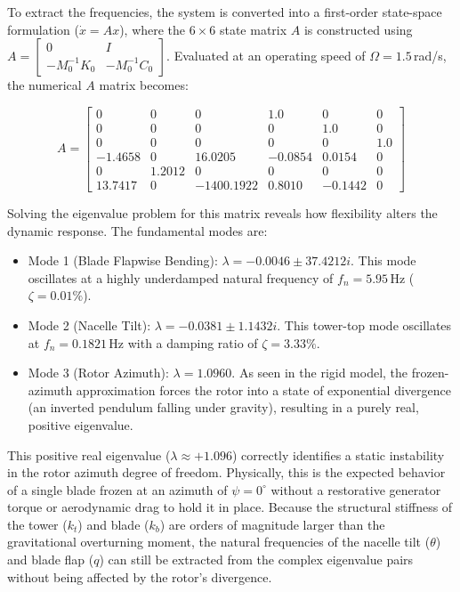 \documentclass[final,onecolumn]{IEEEtran}
\begin{document}
To extract the frequencies, the system is converted into a first-order state-space formulation ($\dot{x} = Ax$), where the $6 \times 6$ state matrix $A$ is constructed using $A = \left[ \begin{smallmatrix} 0 & I \\ -M_0^{-1}K_0 & -M_0^{-1}C_0 \end{smallmatrix} \right]$. Evaluated at an operating speed of $\Omega = 1.5$\,rad/s, the numerical $A$ matrix becomes:

\begin{equation}
    \label{eq:linear2_A_matrix}
    A = \begin{bmatrix}
        0       & 0      & 0          & 1.0     & 0       & 0   \\
        0       & 0      & 0          & 0       & 1.0     & 0   \\
        0       & 0      & 0          & 0       & 0       & 1.0 \\
        -1.4658 & 0      & 16.0205    & -0.0854 & 0.0154  & 0   \\
        0       & 1.2012 & 0          & 0       & 0       & 0   \\
        13.7417 & 0      & -1400.1922 & 0.8010  & -0.1442 & 0
    \end{bmatrix}
\end{equation}

Solving the eigenvalue problem for this matrix reveals how flexibility alters the dynamic response. The fundamental modes are:

\begin{itemize}
    \item Mode 1 (Blade Flapwise Bending): $\lambda = -0.0046 \pm 37.4212i$. This mode oscillates at a highly underdamped natural frequency of $f_n = 5.95$\,Hz ($\zeta = 0.01\%$).
    \item Mode 2 (Nacelle Tilt): $\lambda = -0.0381 \pm 1.1432i$. This tower-top mode oscillates at $f_n = 0.1821$\,Hz with a damping ratio of $\zeta = 3.33\%$.
    \item Mode 3 (Rotor Azimuth): $\lambda = 1.0960$. As seen in the rigid model, the frozen-azimuth approximation forces the rotor into a state of exponential divergence (an inverted pendulum falling under gravity), resulting in a purely real, positive eigenvalue.
\end{itemize}

This positive real eigenvalue ($\lambda \approx +1.096$) correctly identifies a static instability in the rotor azimuth degree of freedom. Physically, this is the expected behavior of a single blade frozen at an azimuth of $\psi=0^\circ$ without a restorative generator torque or aerodynamic drag to hold it in place. Because the structural stiffness of the tower ($k_t$) and blade ($k_b$) are orders of magnitude larger than the gravitational overturning moment, the natural frequencies of the nacelle tilt ($\theta$) and blade flap ($q$) can still be extracted from the complex eigenvalue pairs without being affected by the rotor's divergence.
\end{document}
